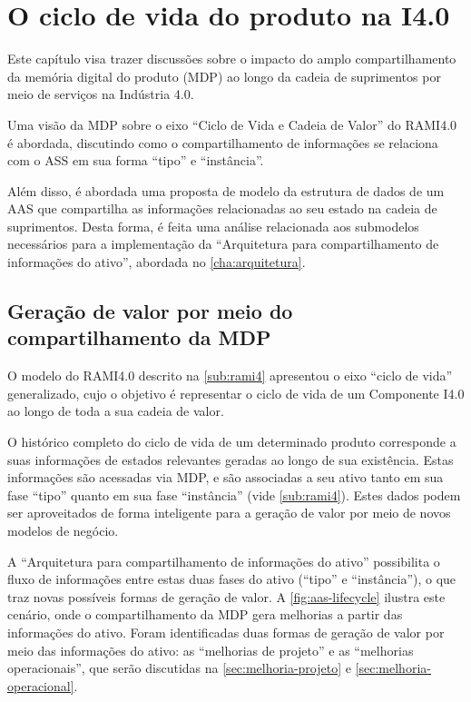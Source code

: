 \chapter{O ciclo de vida do produto na I4.0}
\label{cha:ciclo-de-vida}

Este capítulo visa trazer discussões sobre o impacto do amplo compartilhamento da memória digital do produto (MDP) ao longo da cadeia de suprimentos por meio de serviços na Indústria 4.0.


Uma visão da MDP sobre o eixo ``Ciclo de Vida e Cadeia de Valor'' do RAMI4.0 é abordada, discutindo como o compartilhamento de informações se relaciona com o ASS em sua forma ``tipo'' e ``instância''.

Além disso, é abordada uma proposta de modelo da estrutura de dados de um AAS que compartilha as informações relacionadas ao seu estado na cadeia de suprimentos. Desta forma, é feita uma análise relacionada aos submodelos necessários para a implementação da ``Arquitetura para compartilhamento de informações do ativo'', abordada no \autoref{cha:arquitetura}.

\section{Geração de valor por meio do compartilhamento da MDP}

O modelo do RAMI4.0 descrito na \autoref{sub:rami4} apresentou o eixo ``ciclo de vida'' generalizado, cujo o objetivo é representar o ciclo de vida de um Componente I4.0 ao longo de toda a sua cadeia de valor.

O histórico completo do ciclo de vida de um determinado produto corresponde a suas informações de estados relevantes geradas ao longo de sua existência. Estas informações são acessadas via MDP, e são associadas a seu ativo tanto em sua fase ``tipo'' quanto em sua fase ``instância'' (vide \autoref{sub:rami4}). Estes dados podem ser aproveitados de forma inteligente para a geração de valor por meio de novos modelos de negócio.

A ``Arquitetura para compartilhamento de informações do ativo'' possibilita o fluxo de informações entre estas duas fases do ativo (``tipo'' e ``instância''), o que traz novas possíveis formas de geração de valor. A \autoref{fig:aas-lifecycle} ilustra este cenário, onde o compartilhamento da MDP gera melhorias a partir das informações do ativo. Foram identificadas duas formas de geração de valor por meio das informações do ativo: as ``melhorias de projeto'' e as ``melhorias operacionais'', que serão discutidas na \autoref{sec:melhoria-projeto} e \autoref{sec:melhoria-operacional}.


